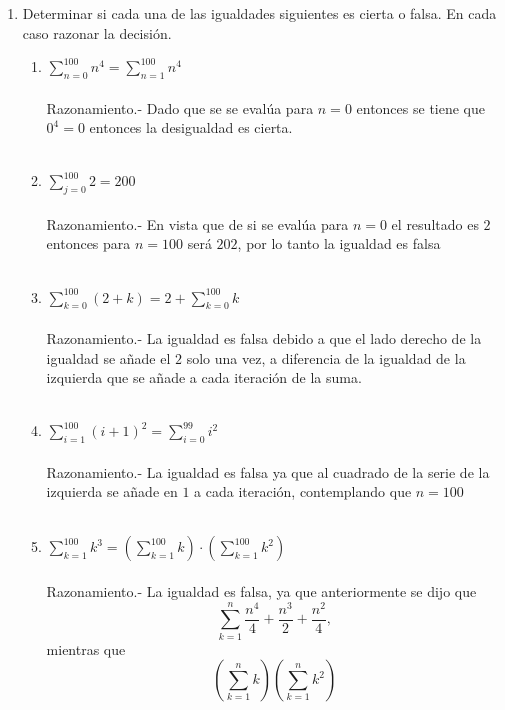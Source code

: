 \begin{enumerate}[\bfseries  1.]
\item Determinar si cada una de las igualdades siguientes es cierta o falsa. En cada caso razonar la decisión.
\begin{enumerate}[\bfseries (a)]
\item $\displaystyle\sum_{n=0}^{100} n^4= \sum_{n=1}^{100} n^4$\\\\
Razonamiento.- \; Dado que se se evalúa para $n=0$ entonces se tiene que $0^4 = 0$ entonces la desigualdad es cierta.\\\\

\item $\displaystyle\sum_{j=0}^{100} 2 = 200$\\\\
Razonamiento.- \; En vista que de si se evalúa para $n=0$ el resultado es $2$ entonces para $n=100$ será $202$, por lo tanto la igualdad es falsa\\\\

\item $\displaystyle\sum_{k=0}^{100} (2+k) = 2 + \sum_{k=0}^{100} k$\\\\
Razonamiento.- \; La igualdad es falsa debido a que el lado derecho de la igualdad se añade el $2$ solo una vez, a diferencia de la igualdad de la izquierda que se añade a cada iteración de la suma.\\\\

\item $\displaystyle\sum_{i=1}^{100} (i+1)^2 = \sum_{i=0}^{99} i^2$\\\\
Razonamiento.- \; La igualdad es falsa ya que al cuadrado de la serie de la izquierda se añade en $1$ a cada iteración, contemplando que $n=100$\\\\ 

\item $\displaystyle\sum_{k=1}^{100} k^3 = \left( \sum_{k=1}^{100} k \right)\cdot \left(  \sum_{k=1}^{100} k^2 \right)$\\\\
Razonamiento.- \; La igualdad es falsa, ya que anteriormente se dijo que $$\sum\limits_{k=1}^{n} \dfrac{n^4}{4} + \dfrac{n^3}{2} + \dfrac{n^2}{4},$$ mientras que $$\left( \sum\limits_{k=1}^{n} k \right)\left( \sum\limits_{k=1}^{n} k^2 \right)$$ \\\\


\end{enumerate}
\end{enumerate}
